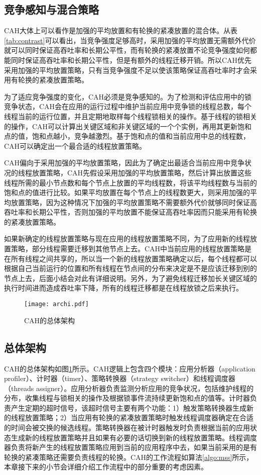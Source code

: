 \subsection{竞争感知与混合策略}
CAH大体上可以看作是加强的平均放置和有轮换的紧凑放置的混合体。从表\ref{tab:contrast}可以看出，当竞争强度足够高时，采用加强的平均放置无需额外代价就可以同时保证高吞吐率和长期公平性，而有轮换的紧凑放置不论竞争强度如何都能同时保证高吞吐率和长期公平性，但是有额外的线程迁移开销。所以CAH优先采用加强的平均放置策略，只有当竞争强度不足以使该策略保证高吞吐率时才会采用有轮换的紧凑放置策略。

为了适应竞争强度的变化，CAH必须是竞争感知的。为了检测和评估应用中的锁竞争状态，CAH会在应用的运行过程中维护当前应用中竞争锁的线程总数，每个线程当前的运行位置，并且定期地取样每个线程锁相关的操作。基于线程的锁相关的操作，CAH可以计算出关键区域和非关键区域的一个个实例，再用其更新饱和点的值，饱和点越小，竞争越激烈。基于饱和点的值和当前应用中总的线程数，CAH可以确定出一个最合适的线程放置策略。

CAH偏向于采用加强的平均放置策略，因此为了确定出最适合当前应用中竞争状况的线程放置策略，CAH先假设采用加强的平均放置策略，然后计算出放置这些线程所需的最小节点数和每个节点上放置的平均线程数，将该平均线程数与当前的饱和点的值进行比较。如果平均放置在每个节点上的线程数更大，则采用加强的平均放置策略，因为这种情况下加强的平均放置策略不需要额外代价就够同时保证高吞吐率和长期公平性，否则加强的平均放置不能保证高吞吐率因而只能采用有轮换的紧凑放置策略。

如果新确定的线程放置策略与现在应用的线程放置策略不同，为了应用新的线程放置策略，部分线程需要迁移到其他节点上去。CAH中当前应用的线程放置策略是在所有线程之间共享的，所以当一个新的线程放置策略确定以后，每个线程都可以根据自己当前运行的位置和所有线程在节点间的分布来决定是不是应该迁移到别的节点上去，后面小结会对此有详细说明。另外，为了避免线程迁移加长关键区域的执行时间进而造成吞吐率下降，所有的线程迁移都是在线程放锁之后来执行。

\begin{figure}[t]
	\centering
	\texttt{[image: archi.pdf]}
	\caption{CAH的总体架构}
	\label{Fig:archi}
\end{figure}

\subsection{总体架构}
CAH的总体架构如图\ref{Fig:archi}所示。CAH逻辑上包含四个模块：应用分析器（application profiler）、计时器（timer）、策略转换器（strategy switcher）和线程调度器（threads assigner）。应用分析器负责监测分析应用的竞争状况，包括维护线程的分布，收集线程与锁相关的操作及根据锁事件流持续更新饱和点的值等。计时器负责产生定期的超时信号，该超时信号主要有两个功能：1）触发策略转换器生成新的线程放置策略；2）当应用有轮换的紧凑放置策略时触发线程调度器确定在合适的时间会被交换的候选线程。策略转换器在被计时器触发时负责根据当前的应用状态生成新的线程放置策略并且如果有必要的话切换到新的线程放置策略。线程调度器负责将新产生的线程放置策略应用到当前的应用程序中去，如果当前采用的是有轮换的紧凑策略还需要负责线程的轮换。CAH的工作流程如算法\ref{algo:mss}所示，本章接下来的小节会详细介绍工作流程中的部分重要的考虑因素。

